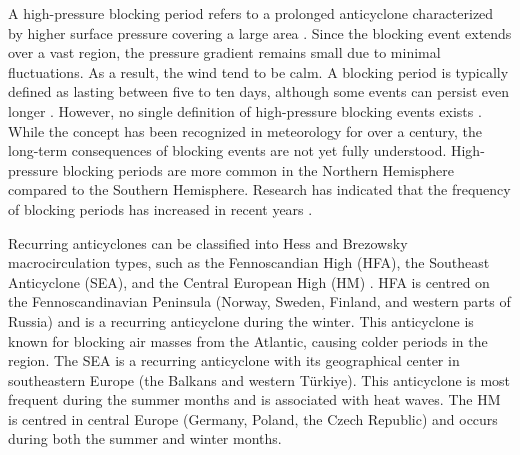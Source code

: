 A high-pressure blocking period refers to a prolonged anticyclone characterized by higher surface pressure covering a large area \cite{lupoAtmosphericBlockingEvents2020}. Since the blocking event extends over a vast region, the pressure gradient remains small due to minimal fluctuations. As a result, the wind tend to be calm. A blocking period is typically defined as lasting between five to ten days, although some events can persist even longer \cite{porebskaAnalysisExtremeTemperature2013}. However, no single definition of high-pressure blocking events exists \cite{lupoAtmosphericBlockingEvents2020}. While the concept has been recognized in meteorology for over a century, the long-term consequences of blocking events are not yet fully understood. High-pressure blocking periods are more common in the Northern Hemisphere compared to the Southern Hemisphere. Research has indicated that the frequency of blocking periods has increased in recent years \cite{lupoAtmosphericBlockingEvents2020}. 

Recurring anticyclones can be classified into Hess and Brezowsky macrocirculation types, such as the Fennoscandian High (HFA), the Southeast Anticyclone (SEA), and the Central European High (HM) \cite{bartholyEuropeanCycloneTrack2006}. HFA is centred on the Fennoscandinavian Peninsula (Norway, Sweden, Finland, and western parts of Russia) and is a recurring anticyclone during the winter. This anticyclone is known for blocking air masses from the Atlantic, causing colder periods in the region. The SEA is a recurring anticyclone with its geographical center in southeastern Europe (the Balkans and western Türkiye). This anticyclone is most frequent during the summer months and is associated with heat waves. The HM is centred in central Europe (Germany, Poland, the Czech Republic) and occurs during both the summer and winter months.

